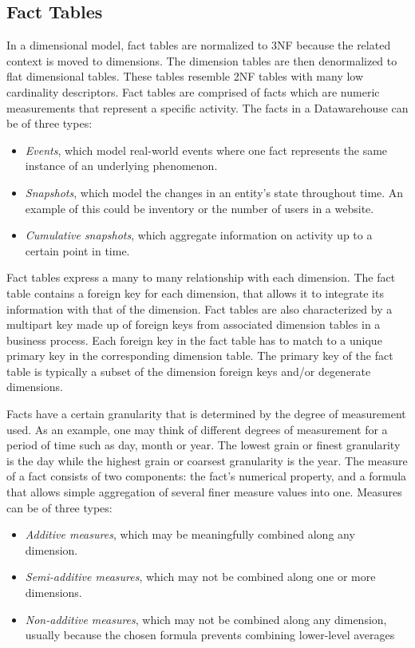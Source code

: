 \documentclass[]{article}
\begin{document}
\subsection{Fact Tables} %
\label{sub:fact_tables}

In a dimensional model, fact tables are normalized to 3NF because the related context is moved to dimensions. The dimension tables are
then denormalized to flat dimensional tables. These tables resemble 2NF tables with many low cardinality descriptors. Fact tables are
comprised of facts which are numeric measurements that represent a specific activity. The facts in a Datawarehouse can be of three types:
\begin{itemize}
	\item \emph{Events}, which model real-world events where one fact represents the same instance of an underlying phenomenon. 
	\item \emph{Snapshots}, which model the changes in an entity's state throughout time. An example of this could be inventory or the number of users in a website.
	\item \emph{Cumulative snapshots}, which aggregate information on activity up to a certain point in time.
\end{itemize}
Fact tables express a many to many relationship with each dimension. The fact table contains a foreign key for each dimension, that
allows it to integrate its information with that of the dimension. Fact tables are also characterized by a multipart key made up of
foreign keys from associated dimension tables in a business process. Each foreign key in the fact table has to match to a unique
primary key in the corresponding dimension table. The primary key of the fact table is typically a subset of the dimension foreign keys
and/or degenerate dimensions.

Facts have a certain granularity that is determined by the degree of measurement used. As an example, one may think of different degrees
of measurement for a period of time such as day, month or year. The lowest grain or finest granularity is the day while the highest
grain or coarsest granularity is the year. The measure of a fact consists of two components: the fact's numerical property, and a
formula that allows simple aggregation of several finer measure values into one. Measures can be of three types:
\begin{itemize}
\item \emph{Additive measures}, which may be meaningfully combined along any dimension.
\item \emph{Semi-additive measures}, which may not be combined along one or more dimensions.
\item \emph{Non-additive measures}, which may not be combined along any dimension, usually because the chosen formula prevents combining lower-level averages
\end{itemize}
\end{document}
